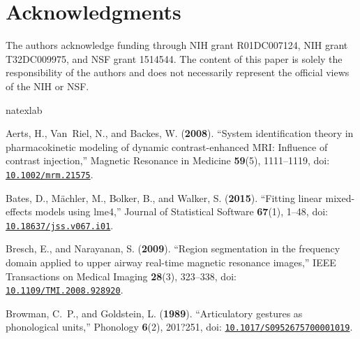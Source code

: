 \documentclass[preprint]{JASAnew}
\begin{document}
\section{Acknowledgments} 

The authors acknowledge funding through NIH grant R01DC007124, NIH grant T32DC009975, and NSF grant 1514544. The content of this paper is solely the responsibility of the authors and does not necessarily represent the official views of the NIH or NSF.

%

\begin{thebibliography}{28}
\def\enquote#1{``#1,''}
\def\plainquote#1{``#1''}
\expandafter\ifx\csname natexlab\endcsname\relax\def\natexlab#1{#1}\fi
\providecommand{\dourl}[1]{\href{http://#1}{\nolinkurl{#1}}}
\providecommand{\bibinfo}[2]{#2}
\providecommand{\noopsort}[1]{}
\providecommand{\switchargs}[2]{#2#1}
  \def\eatspace #1{#1}
\providecommand{\dodoi}[1]{doi: \href{http://dx.doi.org/#1}{\nolinkurl{#1}}}

\bibinfo{author}{Aerts, H.}, \bibinfo{author}{Van~Riel, N.},  and
  \bibinfo{author}{Backes, W.} (\textbf{\bibinfo{year}{2008}}).
  \enquote{\bibinfo{title}{System identification theory in pharmacokinetic
  modeling of dynamic contrast-enhanced {MRI}: Influence of contrast
  injection}} \bibinfo{journal}{Magnetic Resonance in Medicine} \textbf{59}(5),
  \bibinfo{pages}{1111--1119}, \dodoi{10.1002/mrm.21575}.

\bibinfo{author}{Bates, D.}, \bibinfo{author}{M{\"a}chler, M.},
  \bibinfo{author}{Bolker, B.},  and \bibinfo{author}{Walker, S.}
  (\textbf{\bibinfo{year}{2015}}). \enquote{\bibinfo{title}{Fitting linear
  mixed-effects models using {lme4}}} \bibinfo{journal}{Journal of Statistical
  Software} \textbf{67}(1), \bibinfo{pages}{1--48},
  \dodoi{10.18637/jss.v067.i01}.

\bibinfo{author}{Bresch, E.},  and \bibinfo{author}{Narayanan, S.}
  (\textbf{\bibinfo{year}{2009}}). \enquote{\bibinfo{title}{Region segmentation
  in the frequency domain applied to upper airway real-time magnetic resonance
  images}} \bibinfo{journal}{IEEE Transactions on Medical Imaging}
  \textbf{28}(3), \bibinfo{pages}{323--338}, \dodoi{10.1109/TMI.2008.928920}.

\bibinfo{author}{Browman, C.~P.},  and \bibinfo{author}{Goldstein, L.}
  (\textbf{\bibinfo{year}{1989}}). \enquote{\bibinfo{title}{Articulatory
  gestures as phonological units}} \bibinfo{journal}{Phonology} \textbf{6}(2),
  \bibinfo{pages}{201?251}, \dodoi{10.1017/S0952675700001019}.


\end{thebibliography}
\end{document}
